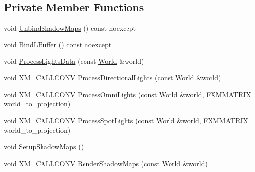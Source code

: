 \subsection*{Private Member Functions}
\begin{DoxyCompactItemize}
\item 
void \mbox{\hyperlink{classmage_1_1rendering_1_1_l_buffer_pass_ac456e0612e540d215d8c709e705ade20}{Unbind\+Shadow\+Maps}} () const noexcept
\item 
void \mbox{\hyperlink{classmage_1_1rendering_1_1_l_buffer_pass_a23370698fd80713b0ea31e1d54a35d44}{Bind\+L\+Buffer}} () const noexcept
\item 
void \mbox{\hyperlink{classmage_1_1rendering_1_1_l_buffer_pass_a1ec1d116e0b9ec1066faa7a2b3db5ca5}{Process\+Lights\+Data}} (const \mbox{\hyperlink{classmage_1_1rendering_1_1_world}{World}} \&world)
\item 
void X\+M\+\_\+\+C\+A\+L\+L\+C\+O\+NV \mbox{\hyperlink{classmage_1_1rendering_1_1_l_buffer_pass_a97047b8acf6e4e552ab8f7b7ec08b1be}{Process\+Directional\+Lights}} (const \mbox{\hyperlink{classmage_1_1rendering_1_1_world}{World}} \&world)
\item 
void X\+M\+\_\+\+C\+A\+L\+L\+C\+O\+NV \mbox{\hyperlink{classmage_1_1rendering_1_1_l_buffer_pass_af9e7e859505ec7ee16155f4e11d98a67}{Process\+Omni\+Lights}} (const \mbox{\hyperlink{classmage_1_1rendering_1_1_world}{World}} \&world, F\+X\+M\+M\+A\+T\+R\+IX world\+\_\+to\+\_\+projection)
\item 
void X\+M\+\_\+\+C\+A\+L\+L\+C\+O\+NV \mbox{\hyperlink{classmage_1_1rendering_1_1_l_buffer_pass_a3172ee6a91c34a1dbf252c388fe1ac20}{Process\+Spot\+Lights}} (const \mbox{\hyperlink{classmage_1_1rendering_1_1_world}{World}} \&world, F\+X\+M\+M\+A\+T\+R\+IX world\+\_\+to\+\_\+projection)
\item 
void \mbox{\hyperlink{classmage_1_1rendering_1_1_l_buffer_pass_a405734dad82467908e68217254e4f2ad}{Setup\+Shadow\+Maps}} ()
\item 
void X\+M\+\_\+\+C\+A\+L\+L\+C\+O\+NV \mbox{\hyperlink{classmage_1_1rendering_1_1_l_buffer_pass_a811b69ff4df7d8a24a042a9677c4b67f}{Render\+Shadow\+Maps}} (const \mbox{\hyperlink{classmage_1_1rendering_1_1_world}{World}} \&world)
\end{DoxyCompactItemize}
